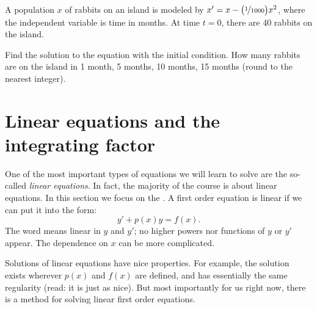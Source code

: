 \begin{exercise}
A population $x$ of rabbits on an island is modeled by
$x' = x- \bigl(\nicefrac{1}{1000} \bigr) x^2$, where the independent
variable is time in months.  At time $t=0$, there are 40 rabbits
on the island.
\begin{tasks}
\task Find the solution to the equation with the initial
condition.
\task
How many rabbits are on the island in 1 month, 5 months, 
10 months, 15 months (round to the nearest integer).
\end{tasks}
\end{exercise}


\sectionnewpage
\section{Linear equations and the integrating factor}
\label{intfactor:section}



One of the most important types of equations we will learn to solve are
the so-called
\emph{linear equations}.
In fact, the majority of the course is about linear
equations.  In this section we focus on the
\emph{}.
A first order equation is linear if we can put it
into the form:
\begin{equation} \label{lineq:eq1}
y' + p(x) y = f(x) .
\end{equation}
The word
 means linear in $y$ and $y'$;
no higher powers nor functions of $y$ or $y'$ appear.
The dependence on $x$ can be more
complicated.

Solutions of linear equations have nice properties.  For example, the
solution exists wherever $p(x)$ and $f(x)$ are defined, and has essentially the same
regularity (read: it is just as nice).  But most importantly for us right now,
there is a method for solving linear first order equations.

